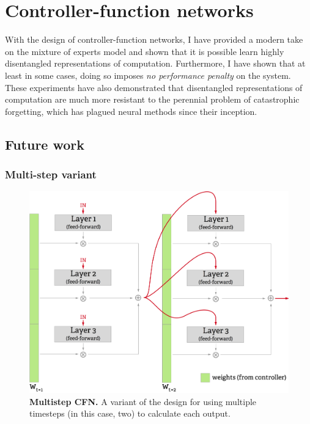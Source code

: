\documentclass[12pt,twoside]{mitthesis}
\begin{document}
\section{Controller-function
networks}\label{controller-function-networks-1}

With the design of controller-function networks, I have provided a
modern take on the mixture of experts model and shown that it is
possible learn highly disentangled representations of computation.
Furthermore, I have shown that at least in some cases, doing so imposes
\emph{no performance penalty} on the system. These experiments have also
demonstrated that disentangled representations of computation are much
more resistant to the perennial problem of catastrophic forgetting,
which has plagued neural methods since their inception.

\subsection{Future work}\label{future-work-1}

\subsubsection{Multi-step variant}\label{sec:multistep}

\begin{figure}[htbp]
\centering
\includegraphics{figures/multistep_small.png}
\caption{\label{fig:multistep}\textbf{Multistep CFN.} A variant of the
design for using multiple timesteps (in this case, two) to calculate
each output.}
\end{figure}
\end{document}
